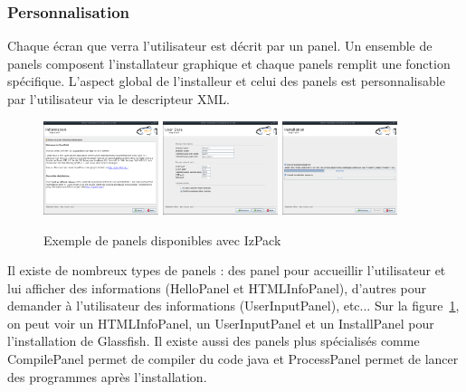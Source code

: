 \subsubsection{Personnalisation}
Chaque écran que verra l'utilisateur est décrit par un panel.
Un ensemble de panels composent l'installateur graphique et chaque panels remplit une fonction spécifique.
L'aspect global de l'installeur et celui des panels est personnalisable par l'utilisateur via le descripteur XML.
\begin{figure}[H]
	\centering
	\includegraphics[width=0.3\textwidth]{../dia/included/install/02.png}
	\includegraphics[width=0.3\textwidth]{../dia/included/install/05.png}
	\includegraphics[width=0.3\textwidth]{../dia/included/install/06.png}
	\caption{Exemple de panels disponibles avec IzPack}
	\label{fig:panelGlass}
\end{figure}
Il existe de nombreux types de panels : des panel pour accueillir l'utilisateur et lui afficher des informations (HelloPanel et HTMLInfoPanel), d'autres pour demander à l'utilisateur des informations (UserInputPanel), etc...
Sur la figure~\ref{fig:panelGlass}, on peut voir un HTMLInfoPanel, un UserInputPanel et un InstallPanel pour l'installation de Glassfish.
Il existe aussi des panels plus spécialisés comme CompilePanel permet de compiler du code java et ProcessPanel permet de lancer des programmes après l'installation.
